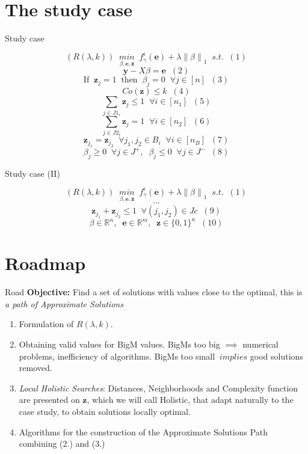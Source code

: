 \section{The study case}

\begin{frame}[t]{Study case}
	
	\[(R(\lambda,k))\;\;\underset{\beta,\mathbf{e},\mathbf{z}}{min}\;\;f^\epsilon_\gamma (\mathbf{e}) + \lambda {\parallel \beta \parallel}_1\;\;s.t.\;\;(1)\]
	\[\mathbf{y} - X \beta = \mathbf{e}\;\;(2)\]
	\[\mbox{If}\;\;\mathbf{z}_j = 1\;\;\mbox{then}\;\;\beta_j = 0\;\;\forall j \in [n]\;\;(3)\]
	\[Co(\mathbf{z})\leq k\;\;(4)\]
	\[\underset{j \in J1_i}{\sum} \mathbf{z}_j \leq 1\;\;\forall i \in [n_1]\;\;(5)\]
	\[\underset{j \in J2_i}{\sum} \mathbf{z}_j = 1\;\;\forall i \in [n_2]\;\;(6)\]
	\[\mathbf{z}_{j_1} = \mathbf{z}_{j_2}\;\;\forall j_1,j_2 \in B_i\;\;\forall i \in [n_B]\;\;(7)\]
	\[\beta_j \geq 0\;\;\forall j \in J^+,\;\;\beta_j \leq 0\;\;\forall j \in J^-\;\;(8)\]

\end{frame}

\begin{frame}[t]{Study case (II)}
	
	\[(R(\lambda,k))\;\;\underset{\beta,\mathbf{e},\mathbf{z}}{min}\;\;f^\epsilon_\gamma (\mathbf{e}) + \lambda {\parallel \beta \parallel}_1\;\;s.t.\;\;(1)\]
	\[ \cdots \]
	\[\mathbf{z}_{j_1} + \mathbf{z}_{j_2} \leq 1\;\;\forall (j_1,j_2) \in Jc\;\;(9)\]
\[\beta \in \mathbb{R}^n,\;\;\mathbf{e} \in \mathbb{R}^m,\;\;\mathbf{z} \in {\lbrace 0,1 \rbrace}^n\;\;(10)\]

	
\end{frame}

\section{Roadmap}


\begin{frame}[t]{Road}
\textbf{Objective:} Find a set of solutions with values close to the optimal, this is {\it a path of Approximate Solutions} 

\begin{enumerate}
	\item Formulation of $ R(\lambda, k)$.
	\item Obtaining valid values for BigM values. 
		BigMs too big $\implies$ numerical problems, inefficiency of algorithms. 
		BigMs too small $ ~ implies $ good solutions removed. 
		\item {\it Local Holistic Searches}: Distances, Neighborhoods and Complexity function are presented on $\mathbf{z}$, which we will call Holistic, that adapt naturally to the case study, to obtain solutions locally optimal.
		\item Algorithms for the construction of the Approximate Solutions 	Path combining (2.) and (3.)
\end{enumerate}
\end{frame}
